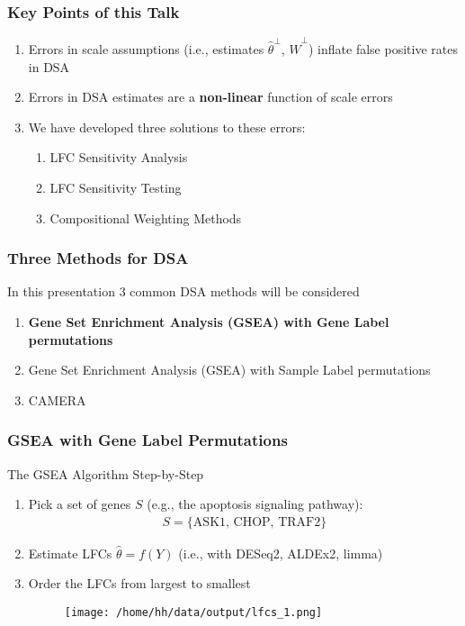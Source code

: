 \documentclass[11pt,t]{beamer}
\begin{document}
\begin{frame}
  \frametitle{Key Points of this Talk}

  \begin{enumerate}
  \item Errors in scale assumptions (i.e., estimates \(\hat{\theta}^\perp\), \(\hat{W}^\perp\)) inflate false positive rates in DSA
    \pause
  \item Errors in DSA estimates are a \textbf{non-linear} function of scale errors
    \pause
  \item We have developed three solutions to these errors:
    \begin{enumerate}
      \item LFC Sensitivity Analysis
      \item LFC Sensitivity Testing
      \item Compositional Weighting Methods
    \end{enumerate}
  \end{enumerate}
\end{frame}

\begin{frame}
  \frametitle{Three Methods for DSA}

  In this presentation 3 common DSA methods will be considered
  \begin{enumerate}
    \item \textbf{Gene Set Enrichment Analysis (GSEA) with Gene Label permutations}
    \item Gene Set Enrichment Analysis (GSEA) with Sample Label permutations
    \item CAMERA
  \end{enumerate}
\end{frame}

\begin{frame}
  \frametitle{GSEA with Gene Label Permutations}

  The GSEA Algorithm Step-by-Step
  \begin{enumerate}
  \item Pick a set of genes \(S\) (e.g., the apoptosis signaling pathway):
    \begin{align*}
      S = \{\text{ASK1, CHOP, TRAF2}\}
    \end{align*}
    \pause
  \item Estimate LFCs \(\hat{\theta}=f(Y)\) (i.e., with DESeq2, ALDEx2, limma)
    \pause
    \item Order the LFCs from largest to smallest
    \begin{figure}
      \texttt{[image: /home/hh/data/output/lfcs\_1.png]}
      \centering
    \end{figure}
  \end{enumerate}
\end{frame}
\end{document}
